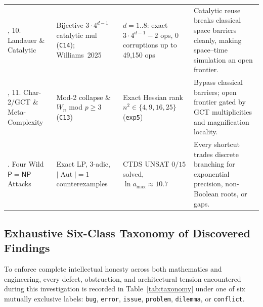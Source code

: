 \documentclass[11pt,reqno]{amsart}
\theoremstyle{definition}
\newcommand{\Aut}{\operatorname{Aut}}
\newcommand{\PP}{\mathsf{P}}
\newcommand{\NP}{\mathsf{NP}}
\begin{document}
\begin{table}[htbp]
\begin{tabularx}{\textwidth}{@{}>{\raggedright\arraybackslash}p{2.9cm}LLL@{}}
, 10. Landauer \& Catalytic & Bijective $3\cdot 4^{d-1}$ catalytic mul (\texttt{C14}); Williams~2025 & $d=1..8$: exact $3\cdot 4^{d-1}-2$ ops, 0 corruptions up to 49,150 ops & Catalytic reuse breaks classical space barriers cleanly, making space--time simulation an open frontier. \\
, 11. Char-2/GCT \& Meta-Complexity & Mod-2 collapse \& $W_n$ mod $p\ge 3$ (\texttt{C13}) & Exact Hessian rank $n^2 \in \{4,9,16,25\}$ (\texttt{exp5}) & Bypass classical barriers; open frontier gated by GCT multiplicities and magnification locality. \\
. Four Wild $\PP=\NP$ Attacks & Exact LP, 3-adic, $|\Aut|=1$ counterexamples & CTDS UNSAT $0/15$ solved, $\ln a_{\max}\approx 10.7$ & Every shortcut trades discrete branching for exponential precision, non-Boolean roots, or gaps. \\
\bottomrule
\end{tabularx}
\end{table}

\subsection{Exhaustive Six-Class Taxonomy of Discovered Findings}
To enforce complete intellectual honesty across both mathematics and engineering, every
defect, obstruction, and architectural tension encountered during this investigation is
recorded in Table~\ref{tab:taxonomy} under one of six mutually exclusive labels:
\texttt{bug}, \texttt{error}, \texttt{issue}, \texttt{problem}, \texttt{dilemma}, or
\texttt{conflict}.
\end{document}
